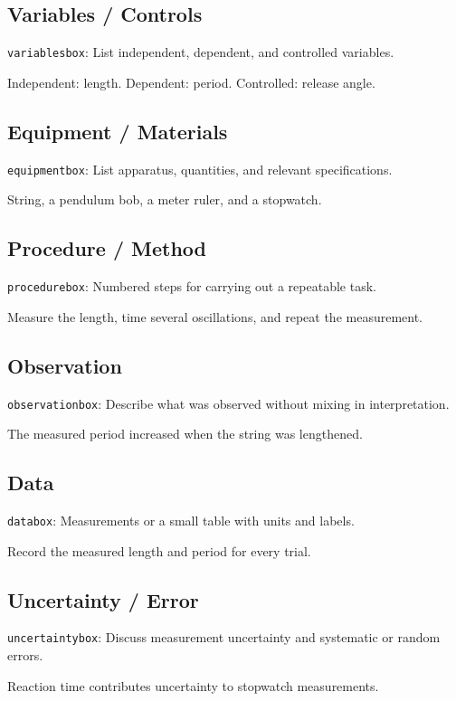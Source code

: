 \documentclass[11pt]{article}
\begin{document}
\subsection{Variables / Controls}
{\small\texttt{variablesbox}: List independent, dependent, and controlled variables.}
\begin{variablesbox}
Independent: length. Dependent: period. Controlled: release angle.
\end{variablesbox}
\subsection{Equipment / Materials}
{\small\texttt{equipmentbox}: List apparatus, quantities, and relevant specifications.}
\begin{equipmentbox}
String, a pendulum bob, a meter ruler, and a stopwatch.
\end{equipmentbox}
\subsection{Procedure / Method}
{\small\texttt{procedurebox}: Numbered steps for carrying out a repeatable task.}
\begin{procedurebox}
Measure the length, time several oscillations, and repeat the measurement.
\end{procedurebox}
\subsection{Observation}
{\small\texttt{observationbox}: Describe what was observed without mixing in interpretation.}
\begin{observationbox}
The measured period increased when the string was lengthened.
\end{observationbox}
\subsection{Data}
{\small\texttt{databox}: Measurements or a small table with units and labels.}
\begin{databox}
Record the measured length and period for every trial.
\end{databox}
\subsection{Uncertainty / Error}
{\small\texttt{uncertaintybox}: Discuss measurement uncertainty and systematic or random errors.}
\begin{uncertaintybox}
Reaction time contributes uncertainty to stopwatch measurements.
\end{uncertaintybox}
\end{document}
